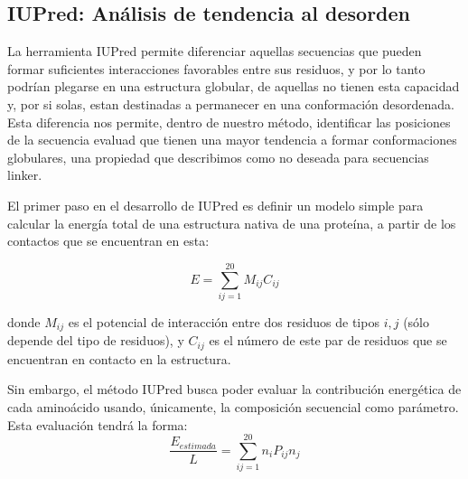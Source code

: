 \subsection{IUPred: Análisis de tendencia al desorden} \label{iupred}

La herramienta IUPred \cite{dosztanyi2005pairwise} permite diferenciar aquellas secuencias que pueden formar suficientes interacciones favorables entre sus residuos, y por lo tanto podrían plegarse en una estructura globular, 
de aquellas no tienen esta capacidad y, por si solas, estan destinadas a permanecer en una conformación desordenada.
Esta diferencia nos permite, dentro de nuestro método, identificar las posiciones de la secuencia evaluad que tienen una mayor tendencia a formar conformaciones globulares, 
una propiedad que describimos como no deseada para secuencias linker.




El primer paso en el desarrollo de IUPred es definir un modelo simple para calcular la energía total de una estructura nativa de una proteína, a partir de los contactos que se encuentran en esta:

\begin{equation}\label{modelo1}
E = \sum_{ij=1}^{20} M_{ij}C_{ij}
\end{equation}

\noindent donde $M_{ij}$ es el potencial de interacción entre dos residuos de tipos $i,j$ (sólo depende del tipo de residuos), y $C_{ij}$ es el número de este par de residuos que se encuentran en contacto en la estructura.

Sin embargo, el método IUPred busca poder evaluar la contribución energética de cada aminoácido usando, únicamente, la composición secuencial como parámetro. 
Esta evaluación tendrá la forma: 
\begin{equation}\label{modelo2}
\frac{E_{estimada}}{L} = \sum_{ij=1}^{20} n_{i}P_{ij}n_{j}
\end{equation}

